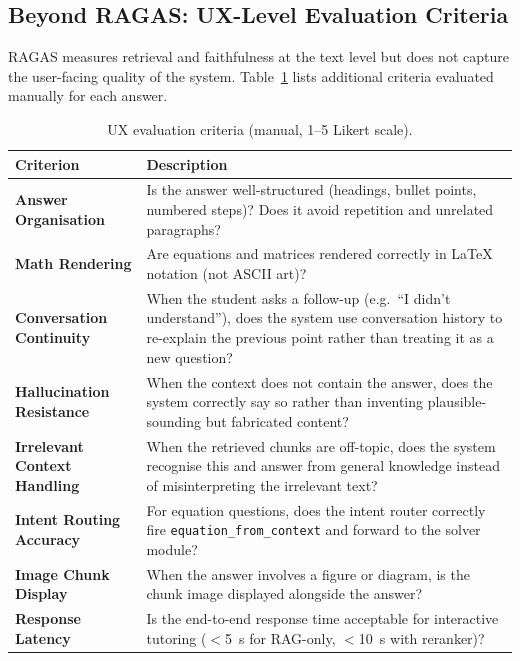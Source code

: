 \documentclass[12pt,a4paper]{article}
\begin{document}
\subsection{Beyond RAGAS: UX-Level Evaluation Criteria}
\label{sec:ux_eval}

RAGAS measures retrieval and faithfulness at the text level but does not capture the user-facing quality of the system. Table~\ref{tab:ux_criteria} lists additional criteria evaluated manually for each answer.

\begin{table}[H]
  \centering
  \caption{UX evaluation criteria (manual, 1--5 Likert scale).}
  \label{tab:ux_criteria}
  \begin{tabular}{lp{8.5cm}}
    \toprule
    \textbf{Criterion} & \textbf{Description} \\
    \midrule
    \textbf{Answer Organisation}    & Is the answer well-structured (headings, bullet points, numbered steps)? Does it avoid repetition and unrelated paragraphs? \\
    \textbf{Math Rendering}         & Are equations and matrices rendered correctly in LaTeX notation (not ASCII art)? \\
    \textbf{Conversation Continuity} & When the student asks a follow-up (e.g.\ ``I didn't understand''), does the system use conversation history to re-explain the previous point rather than treating it as a new question? \\
    \textbf{Hallucination Resistance} & When the context does not contain the answer, does the system correctly say so rather than inventing plausible-sounding but fabricated content? \\
    \textbf{Irrelevant Context Handling} & When the retrieved chunks are off-topic, does the system recognise this and answer from general knowledge instead of misinterpreting the irrelevant text? \\
    \textbf{Intent Routing Accuracy} & For equation questions, does the intent router correctly fire \texttt{equation\_from\_context} and forward to the solver module? \\
    \textbf{Image Chunk Display}    & When the answer involves a figure or diagram, is the chunk image displayed alongside the answer? \\
    \textbf{Response Latency}       & Is the end-to-end response time acceptable for interactive tutoring ($<$5~s for RAG-only, $<$10~s with reranker)? \\
    \bottomrule
  \end{tabular}
\end{table}
\end{document}
